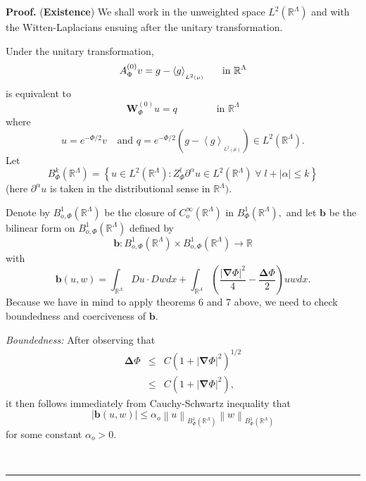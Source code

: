 \documentclass{article}
\newenvironment{proof}[1][Proof]{\noindent\textbf{#1.} }{\ \rule{0.5em}{0.5em}}
\begin{document}
\begin{proof}
(\textbf{Existence}) We shall work in the unweighted space $L^{2}(\mathbb{R}%
^{\Lambda })$ and with the Witten-Laplacians ensuing after the unitary
transformation.

Under the unitary transformation,%
\begin{equation*}
A_{\Phi }^{(0)}v=g-\left\langle g\right\rangle _{_{L^{2}(\mu )}\text{\ \ \ \
\ }}\text{ in }\mathbb{R}^{\Lambda }
\end{equation*}%
is equivalent to%
\begin{equation*}
\mathbf{W}_{\Phi }^{\left( 0\right) }u=q\;\;\;\;\ \ \ \ \ \ \ \ \ \ \ \ \ 
\text{in }\mathbb{R}^{\Lambda }
\end{equation*}%
where 
\begin{equation*}
u=e^{-\Phi /2}v\;\;\ \;\text{and \ \ \ \ }q=e^{-\Phi /2}(g-\left\langle
g\right\rangle _{_{L^{2}(\mu )}})\in L^{2}(\mathbb{R}^{\Lambda }).
\end{equation*}%
Let%
\begin{equation*}
B_{\Phi }^{k}(\mathbb{R}^{\Lambda })=\left\{ u\in L^{2}(\mathbb{R}^{\Lambda
}):Z_{\Phi }^{l}\partial ^{\alpha }u\in L^{2}(\mathbb{R}^{\Lambda
})\;\forall \;l+\left| \alpha \right| \leq k\right\}
\end{equation*}%
(here $\partial ^{\alpha }u$ is taken in the distributional sense in $%
\mathbb{R}^{\Lambda }).$

Denote by $B_{o,\Phi }^{1}(\mathbb{R}^{\Lambda })$ be the closure of $%
C_{o}^{\infty }(\mathbb{R}^{\Lambda })$ in $B_{\Phi }^{1}(\mathbb{R}%
^{\Lambda }),$ and let $\mathbf{b}$ be the bilinear form on $B_{o,\Phi }^{1}(%
\mathbb{R}^{\Lambda })$ defined by 
\begin{equation*}
\mathbf{b}:B_{o,\Phi }^{1}(\mathbb{R}^{\Lambda })\times B_{o,\Phi }^{1}(%
\mathbb{R}^{\Lambda })\rightarrow \mathbb{R}
\end{equation*}%
with 
\begin{equation*}
\mathbf{b}(u,w)=\int_{\mathbb{R}^{\Lambda }}Du\cdot Dwdx+\int_{\mathbb{R}%
^{\Lambda }}\left( \dfrac{\left| \mathbf{\nabla }\Phi \right| ^{2}}{4}-%
\dfrac{\mathbf{\Delta }\Phi }{2}\right) uwdx.
\end{equation*}%
Because we have in mind to apply theorems 6 and 7 above, we need to check
boundedness and coerciveness of $\mathbf{b.}$

\textit{Boundedness:} After observing that 
\begin{eqnarray*}
\mathbf{\Delta }\Phi &\leq &C(1+\left| \mathbf{\nabla }\Phi \right|
^{2})^{1/2} \\
&\leq &C(1+\left| \mathbf{\nabla }\Phi \right| ^{2}),
\end{eqnarray*}%
it then follows immediately from Cauchy-Schwartz inequality that 
\begin{equation*}
\left| \mathbf{b}(u,w)\right| \leq \alpha _{o}\left\| u\right\| _{B_{\Phi
}^{1}(\mathbb{R}^{\Lambda })}\left\| w\right\| _{B_{\Phi }^{1}(\mathbb{R}%
^{\Lambda })}
\end{equation*}%
for some constant $\alpha _{o}>0.$


\end{proof}
\end{document}
